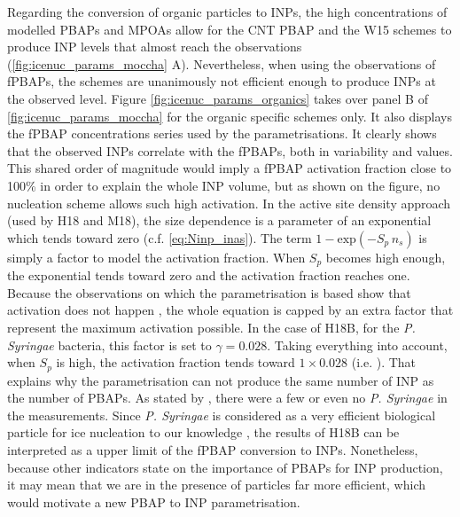     Regarding the conversion of organic particles to INPs, the high concentrations of modelled PBAPs and MPOAs allow for the CNT PBAP and the W15 schemes to produce INP levels that almost reach the observations (\cref{fig:icenuc_params_moccha} A).
    Nevertheless, when using the observations of fPBAPs, the schemes are unanimously not efficient enough to produce INPs at the observed level.
    Figure \ref{fig:icenuc_params_organics} takes over panel B of \cref{fig:icenuc_params_moccha} for the organic specific schemes only. It also displays the fPBAP concentrations series used by the parametrisations. 
    It clearly shows that the observed INPs correlate with the fPBAPs, both in variability and values. This shared order of magnitude would imply a fPBAP activation fraction close to 100\% in order to explain the whole INP volume, but as shown on the figure, no nucleation scheme allows such high activation.
    In the active site density approach (used by H18 and M18), the size dependence is a parameter of an exponential which tends toward zero (c.f. \cref{eq:Ninp_inas}). %
    The term $1 - \text{exp}(-S_p\,n_s)$ is simply a factor to model the activation fraction. When $S_p$ becomes high enough, the exponential tends toward zero and the activation fraction reaches one.
    Because the observations on which the parametrisation is based show that  activation does not happen \citep{hummel_simulating_2018}, the whole equation is capped by an extra factor that represent the maximum activation possible. In the case of H18B, for the \textit{P. Syringae} bacteria, this factor is set to $\gamma = 0.028$.
    Taking everything into account, when $S_p$ is high, the activation fraction tends toward $1\times0.028$ (i.e. ). That explains why the parametrisation can not produce the same number of INP as the number of PBAPs. 
    As stated by \citet{kojoj_arctic_2024}, there were a few or even no \textit{P. Syringae} in the measurements. Since \textit{P. Syringae} is considered as a very efficient biological particle for ice nucleation to our knowledge \citep{maki_ice_1974, joly_ice_2013, amato_survival_2015}, the results of H18B can be interpreted as a upper limit of the fPBAP conversion to INPs.
    Nonetheless, because other indicators state on the importance of PBAPs for INP production, it may mean that we are in the presence of particles far more efficient, which would motivate a new PBAP to INP parametrisation.


